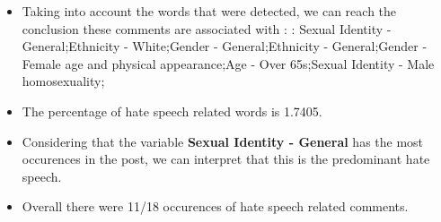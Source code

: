\documentclass[11pt]{article}
\begin{document}
\begin{itemize}\item Taking into account the words that were detected, we can reach the conclusion these comments are associated with : : Sexual Identity - General;Ethnicity - White;Gender - General;Ethnicity - General;Gender - Female age and physical appearance;Age - Over 65s;Sexual Identity - Male homosexuality;%

\item The percentage of hate speech related words is 1.7405.

\item Considering that the variable \textbf{Sexual Identity - General} has the most occurences in the post, we can interpret that this is the predominant hate speech.

\item Overall there were 11/18 occurences of hate speech related comments.\end{itemize}
\end{document}
